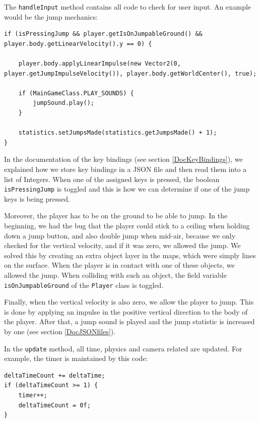 \documentclass[12p]{article}
\begin{document}
The \texttt{handleInput} method contains all code to check for user input. An example would be the jump mechanics:

\begin{verbatim}
if (isPressingJump && player.getIsOnJumpableGround() && player.body.getLinearVelocity().y == 0) {

    player.body.applyLinearImpulse(new Vector2(0, player.getJumpImpulseVelocity()), player.body.getWorldCenter(), true);

    if (MainGameClass.PLAY_SOUNDS) {
        jumpSound.play();
    }

    statistics.setJumpsMade(statistics.getJumpsMade() + 1);
}
\end{verbatim}

In the documentation of the key bindings (see section \ref{DocKeyBindings}), we explained how we store key bindings in a JSON file and then read them into a list of Integers. When one of the assigned keys is pressed, the boolean \texttt{isPressingJump} is toggled and this is how we can determine if one of the jump keys is being pressed.

Moreover, the player has to be on the ground to be able to jump. In the beginning, we had the bug that the player could stick to a ceiling when holding down a jump button, and also double jump when mid-air, because we only checked for the vertical velocity, and if it was zero, we allowed the jump. We solved this by creating an extra object layer in the maps, which were simply lines on the surface. When the player is in contact with one of these objects, we allowed the jump. When colliding with such an object, the field variable \texttt{isOnJumpableGround} of the \texttt{Player} class is toggled.

Finally, when the vertical velocity is also zero, we allow the player to jump. This is done by applying an impulse in the positive vertical direction to the body of the player. After that, a jump sound is played and the jump statistic is increased by one (see section \ref{DocJSONfiles}).

In the \texttt{update} method, all time, physics and camera related are updated. For example, the timer is maintained by this code:

\begin{verbatim}
deltaTimeCount += deltaTime;
if (deltaTimeCount >= 1) {
    timer++;
    deltaTimeCount = 0f;
}
\end{verbatim}
\end{document}

